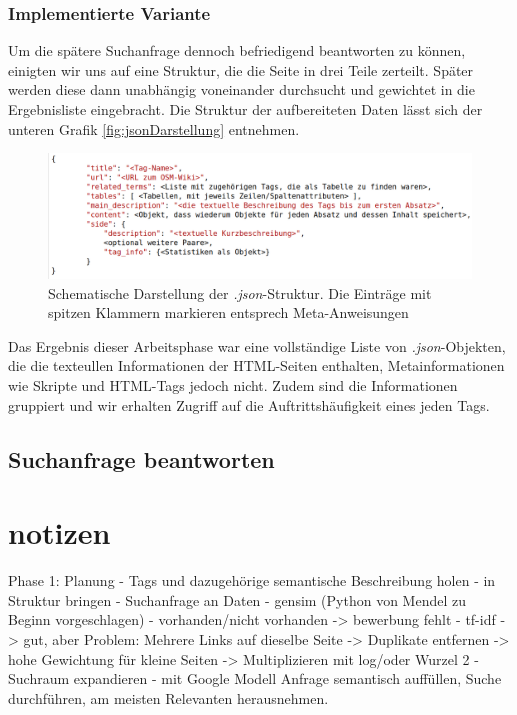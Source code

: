 \documentclass[12pt,pdftex,a4paper]{article}
\begin{document}
\subsubsection{Implementierte Variante}
Um die spätere Suchanfrage dennoch befriedigend beantworten zu können, einigten wir uns auf eine Struktur, die die Seite in drei Teile zerteilt. Später werden diese dann unabhängig voneinander durchsucht und gewichtet in die Ergebnisliste eingebracht. Die Struktur der aufbereiteten Daten lässt sich der unteren Grafik \autoref{fig:jsonDarstellung} entnehmen.\\
\begin{figure}[h]
	\centering
	\includegraphics[width=0.9\linewidth]{Bilder/json_structure}
	\caption[Schematische Darstellung]{Schematische Darstellung der \textit{.json}-Struktur. Die Einträge mit spitzen Klammern markieren entsprech Meta-Anweisungen}
	\label{fig:jsonDarstellung}
\end{figure}
Das Ergebnis dieser Arbeitsphase war eine vollständige Liste von \textit{.json}-Objekten, die die texteullen Informationen der HTML-Seiten enthalten, Metainformationen wie Skripte und HTML-Tags jedoch nicht. Zudem sind die Informationen gruppiert und wir erhalten Zugriff auf die Auftrittshäufigkeit eines jeden Tags.

\subsection{Suchanfrage beantworten}



\section{notizen}
Phase 1: Planung
- Tags und dazugehörige semantische Beschreibung holen
- in Struktur bringen
- Suchanfrage an Daten 
    - gensim (Python von Mendel zu Beginn vorgeschlagen)
	- vorhanden/nicht vorhanden 
		-> bewerbung fehlt
	- tf-idf
		-> gut, aber Problem: Mehrere Links auf dieselbe Seite
			-> Duplikate entfernen
		-> hohe Gewichtung für kleine Seiten
			-> Multiplizieren mit log/oder Wurzel 2
- Suchraum expandieren
	- mit Google Modell Anfrage semantisch auffüllen, Suche durchführen, am meisten Relevanten herausnehmen.
\end{document}
